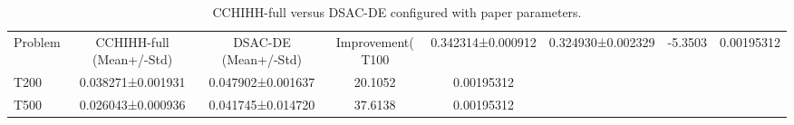 \begin{table}[t]
\centering
\caption{CCHIHH-full versus DSAC-DE configured with paper parameters.}
\label{tab:dsac_de_vs_full}
\begin{tabular}{lcccc}
\hline
Problem & CCHIHH-full (Mean+/-Std) & DSAC-DE (Mean+/-Std) & Improvement(%
\hline
T100 & 0.342314±0.000912 & 0.324930±0.002329 & -5.3503 & 0.00195312 \\
T200 & 0.038271±0.001931 & 0.047902±0.001637 & 20.1052 & 0.00195312 \\
T500 & 0.026043±0.000936 & 0.041745±0.014720 & 37.6138 & 0.00195312 \\
\hline
\end{tabular}
\end{table}